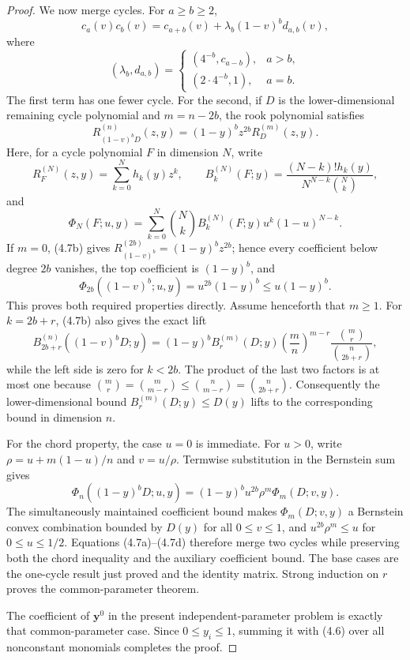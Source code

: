 \documentclass[11pt]{article}
\begin{document}
\begin{proof}
We now merge cycles.  For $a\ge b\ge2$,
\[
c_a(v)c_b(v)=c_{a+b}(v)+\lambda_b(1-v)^bd_{a,b}(v), \tag{4.7a}
\]
where
\[
(\lambda_b,d_{a,b})=
\begin{cases}
(4^{-b},c_{a-b}),&a>b,\\
(2\cdot4^{-b},1),&a=b.
\end{cases}
\]
The first term has one fewer cycle.  For the second, if $D$ is the
lower-dimensional remaining cycle polynomial and $m=n-2b$, the rook
polynomial satisfies
\[
R_{(1-v)^bD}^{(n)}(z,y)
=(1-y)^bz^{2b}R_D^{(m)}(z,y). \tag{4.7b}
\]
Here, for a cycle polynomial $F$ in dimension $N$, write
\[
 R_F^{(N)}(z,y)=\sum_{k=0}^Nh_k(y)z^k,
 \qquad
 B_k^{(N)}(F;y)=
 \frac{(N-k)!h_k(y)}{N^{N-k}\binom Nk},
\]
and
\[
 \Phi_N(F;u,y)=\sum_{k=0}^N\binom Nk
 B_k^{(N)}(F;y)u^k(1-u)^{N-k}.
\]
If $m=0$, (4.7b) gives
$R_{(1-v)^b}^{(2b)}=(1-y)^bz^{2b}$; hence every coefficient below
degree $2b$ vanishes, the top coefficient is $(1-y)^b$, and
\[
 \Phi_{2b}((1-v)^b;u,y)=u^{2b}(1-y)^b
 \le u(1-y)^b.
\]
This proves both required properties directly.  Assume henceforth that
$m\ge1$.  For $k=2b+r$, (4.7b) also gives the exact lift
\[
 B_{2b+r}^{(n)}((1-v)^bD;y)
 =(1-y)^b B_r^{(m)}(D;y)
 \left(\frac mn\right)^{m-r}
 \frac{\binom mr}{\binom n{2b+r}}, \tag{4.7c}
\]
while the left side is zero for $k<2b$.  The product of the last two
factors is at most one because
$\binom mr=\binom m{m-r}\le\binom n{m-r}=\binom n{2b+r}$.
Consequently the lower-dimensional bound
$B_r^{(m)}(D;y)\le D(y)$ lifts to the corresponding bound in dimension
$n$.

For the chord property, the case $u=0$ is immediate.  For $u>0$, write
$\rho=u+m(1-u)/n$ and $v=u/\rho$.  Termwise substitution in the
Bernstein sum gives
\[
\Phi_n((1-y)^bD;u,y)
=(1-y)^bu^{2b}\rho^m\Phi_m(D;v,y). \tag{4.7d}
\]
The simultaneously maintained coefficient bound makes
$\Phi_m(D;v,y)$ a Bernstein convex combination bounded by $D(y)$ for
all $0\le v\le1$, and
$u^{2b}\rho^m\le u$ for $0\le u\le1/2$.
Equations (4.7a)--(4.7d) therefore merge two cycles while preserving both
the chord inequality and the auxiliary coefficient bound.  The base cases are
the one-cycle result just proved and the identity matrix.  Strong induction on
$r$ proves the common-parameter theorem.

The coefficient of $\mathbf y^0$ in the present independent-parameter
problem is exactly that common-parameter case.  Since
$0\le y_i\le1$, summing it with (4.6) over all nonconstant monomials
completes the proof.
\end{proof}
\end{document}
